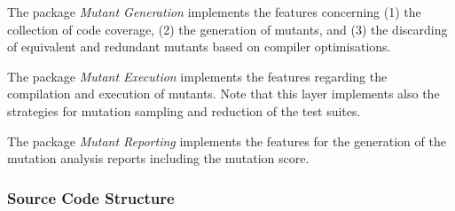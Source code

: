 The package \textit{Mutant Generation} implements the features concerning (1) the collection of code coverage, (2) the generation of mutants, and (3) the discarding of equivalent and redundant mutants based on compiler optimisations.

The package \textit{Mutant Execution} implements the features regarding the compilation and execution of mutants. Note that this layer implements also the strategies for mutation sampling and reduction of the test suites.

The package \textit{Mutant Reporting} implements the features for the generation of the mutation analysis reports including the mutation score.


\subsubsection{Source Code Structure}


